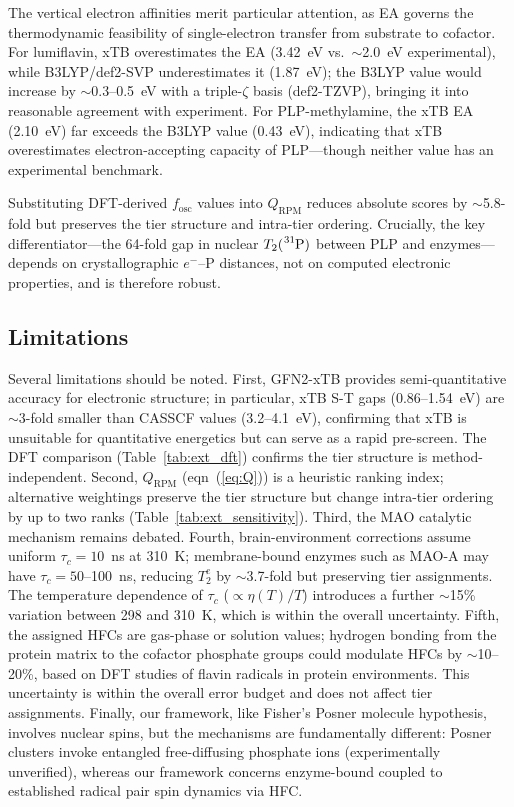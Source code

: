 \documentclass[twoside,twocolumn,9pt]{article}
\begin{document}
The vertical electron affinities merit particular attention, as EA governs the thermodynamic feasibility of single-electron transfer from substrate to cofactor. For lumiflavin, xTB overestimates the EA (3.42~eV vs.\ $\sim$2.0~eV experimental), while B3LYP/def2-SVP underestimates it (1.87~eV); the B3LYP value would increase by $\sim$0.3--0.5~eV with a triple-$\zeta$ basis (def2-TZVP), bringing it into reasonable agreement with experiment. For PLP-methylamine, the xTB EA (2.10~eV) far exceeds the B3LYP value (0.43~eV), indicating that xTB overestimates electron-accepting capacity of PLP---though neither value has an experimental benchmark.

Substituting DFT-derived $f_\mathrm{osc}$ values into $Q_\mathrm{RPM}$ reduces absolute scores by $\sim$5.8-fold but preserves the tier structure and intra-tier ordering. Crucially, the key differentiator---the 64-fold gap in nuclear $T_2(\ce{^{31}P})$ between PLP and  enzymes---depends on crystallographic $e^-$--P distances, not on computed electronic properties, and is therefore robust.

\subsection{Limitations}
\label{sec:limitations}

Several limitations should be noted. First, GFN2-xTB provides semi-quantitative accuracy for electronic structure; in particular, xTB S-T gaps (0.86--1.54~eV) are $\sim$3-fold smaller than CASSCF values (3.2--4.1~eV), confirming that xTB is unsuitable for quantitative energetics but can serve as a rapid pre-screen. The DFT comparison (Table~\ref{tab:ext_dft}) confirms the tier structure is method-independent. Second, $Q_\mathrm{RPM}$ (eqn~(\ref{eq:Q})) is a heuristic ranking index; alternative weightings preserve the tier structure but change intra-tier ordering by up to two ranks (Table~\ref{tab:ext_sensitivity}). Third, the MAO catalytic mechanism remains debated.\cite{Vianello2012} Fourth, brain-environment corrections assume uniform $\tau_c = 10$~ns at 310~K; membrane-bound enzymes such as MAO-A may have $\tau_c = 50$--100~ns, reducing $T_2^e$ by $\sim$3.7-fold but preserving tier assignments. The temperature dependence of $\tau_c$ ($\propto \eta(T)/T$) introduces a further $\sim$15\% variation between 298 and 310~K, which is within the overall uncertainty. Fifth, the assigned  HFCs are gas-phase or solution values; hydrogen bonding from the protein matrix to the cofactor phosphate groups could modulate HFCs by $\sim$10--20\%, based on DFT studies of flavin radicals in protein environments.\cite{Weber1998} This uncertainty is within the overall error budget and does not affect tier assignments. Finally, our framework, like Fisher's Posner molecule hypothesis,\cite{Fisher2015} involves  nuclear spins, but the mechanisms are fundamentally different: Posner clusters invoke entangled free-diffusing phosphate ions (experimentally unverified), whereas our framework concerns enzyme-bound  coupled to established radical pair spin dynamics via HFC.
\end{document}
